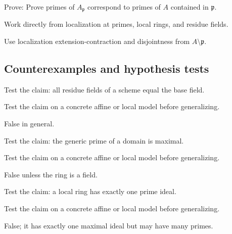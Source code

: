 \begin{exercise}\label{exr:vi11-expand-09}
Prove: Prove primes of $A_{\mathfrak p}$ correspond to primes of $A$ contained in $\mathfrak p$.
\end{exercise}
\begin{hint}
Work directly from localization at primes, local rings, and residue fields.
\end{hint}
\begin{solution}
Use localization extension-contraction and disjointness from $A\setminus\mathfrak p$.
\end{solution}

\subsection*{Counterexamples and hypothesis tests}

\begin{exercise}\label{exr:vi11-expand-10}
Test the claim: all residue fields of a scheme equal the base field.
\end{exercise}
\begin{hint}
Test the claim on a concrete affine or local model before generalizing.
\end{hint}
\begin{solution}
False in general.
\end{solution}

\begin{exercise}\label{exr:vi11-expand-11}
Test the claim: the generic prime of a domain is maximal.
\end{exercise}
\begin{hint}
Test the claim on a concrete affine or local model before generalizing.
\end{hint}
\begin{solution}
False unless the ring is a field.
\end{solution}

\begin{exercise}\label{exr:vi11-expand-12}
Test the claim: a local ring has exactly one prime ideal.
\end{exercise}
\begin{hint}
Test the claim on a concrete affine or local model before generalizing.
\end{hint}
\begin{solution}
False; it has exactly one maximal ideal but may have many primes.
\end{solution}

